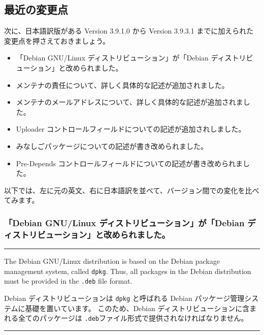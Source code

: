 \documentclass[mingoth,a4paper]{jsarticle}
\begin{document}
\subsection{最近の変更点}
次に、日本語訳版がある Version 3.9.1.0 から Version 3.9.3.1 までに加えられた変更点を押さえておきましょう。

\begin{itemize}
\item 「Debian GNU/Linux ディストリビューション」が「Debian ディストリビューション」と改められました。
\item メンテナの責任について、詳しく具体的な記述が追加されました。
\item メンテナのメールアドレスについて、詳しく具体的な記述が追加されました。
\item Uploader コントロールフィールドについての記述が追加されしました。
\item みなしごパッケージについての記述が書き改められました。
\item Pre-Depends コントロールフィールドについての記述が書き改められました。
\end{itemize}

以下では、左に元の英文、右に日本語訳を並べて、バージョン間での変化を比べてみます。

\clearpage

\subsubsection{ 「Debian GNU/Linux ディストリビューション」が「Debian ディストリビューション」と改められました。}

\vspace{1ex}
\hrule
{}\par
\parbox{0.48\linewidth}{
	  The Debian GNU/Linux distribution is based on the Debian
	  package management system, called {\tt dpkg}. Thus,
	  all packages in the Debian distribution must be provided
	  in the {\tt .deb} file format.
}\hfil
\parbox{0.48\linewidth}{
	  Debian ディストリビューションは {\tt dpkg}
	  と呼ばれる Debian パッケージ管理システムに基礎を置いています。
	  このため、Debian ディストリビューションに含まれる全てのパッケージは
	   {\tt .deb}ファイル形式で提供されなければなりません。
}
\hrule
\end{document}
